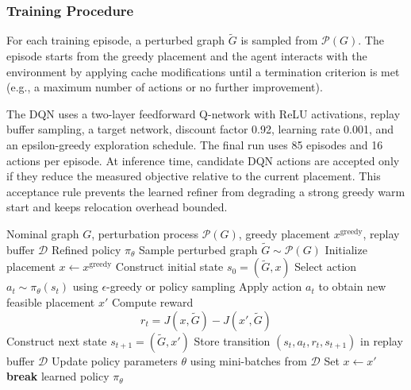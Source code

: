 \subsubsection{Training Procedure}
For each training episode, a perturbed graph \(\tilde{G}\) is sampled from \(\mathcal{P}(G)\). The episode starts from the greedy placement and the agent interacts with the environment by applying cache modifications until a termination criterion is met (e.g., a maximum number of actions or no further improvement).

The DQN uses a two-layer feedforward Q-network with ReLU activations, replay buffer sampling, a target network, discount factor 0.92, learning rate 0.001, and an epsilon-greedy exploration schedule. The final run uses 85 episodes and 16 actions per episode. At inference time, candidate DQN actions are accepted only if they reduce the measured objective relative to the current placement. This acceptance rule prevents the learned refiner from degrading a strong greedy warm start and keeps relocation overhead bounded.

\begin{algorithm}[t]
\caption{DRL Refinement under Topology Perturbation}
\label{alg:drl}
\begin{algorithmic}[1]
\Require Nominal graph \(G\), perturbation process \(\mathcal{P}(G)\), greedy placement \(x^{\text{greedy}}\), replay buffer \(\mathcal{D}\)
\Ensure Refined policy \(\pi_\theta\)
    \State Sample perturbed graph \(\tilde{G} \sim \mathcal{P}(G)\)
    \State Initialize placement \(x \gets x^{\text{greedy}}\)
    \State Construct initial state \(s_0 = (\tilde{G}, x)\)
        \State Select action \(a_t \sim \pi_\theta(s_t)\) using \(\epsilon\)-greedy or policy sampling
        \State Apply action \(a_t\) to obtain new feasible placement \(x'\)
        \State Compute reward
        \[
        r_t = J(x,\tilde{G}) - J(x',\tilde{G})
        \]
        \State Construct next state \(s_{t+1} = (\tilde{G}, x')\)
        \State Store transition \((s_t, a_t, r_t, s_{t+1})\) in replay buffer \(\mathcal{D}\)
        \State Update policy parameters \(\theta\) using mini-batches from \(\mathcal{D}\)
        \State Set \(x \gets x'\)
            \State \textbf{break}
        \EndIf
    \EndFor
\EndFor
\State \Return learned policy \(\pi_\theta\)
\end{algorithmic}
\end{algorithm}

